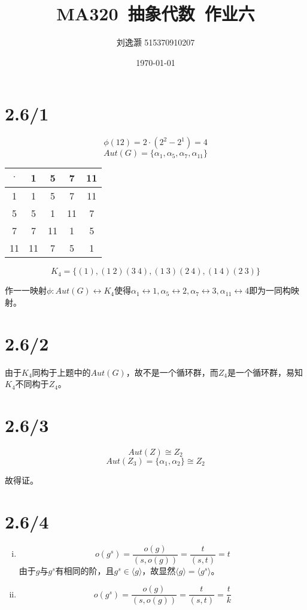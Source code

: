 \documentclass{article}
\title{MA320\ 抽象代数\ 作业六}
\author{刘逸灏 515370910207}
\date{\today}
\begin{document}
\maketitle

\section{2.6/1}
$$\phi(12)=2\cdot(2^2-2^1)=4$$
$$Aut(G)=\{\alpha_1,\alpha_5,\alpha_7,\alpha_{11}\}$$
\begin{center}
\begin{tabular}{c|cccc}
$\cdot$ & 1 & 5 & 7 & 11 \\\hline
1 & 1 & 5 & 7 & 11 \\
5 & 5 & 1 & 11 & 7\\
7 & 7 & 11 & 1 & 5\\
11 & 11 & 7 & 5 & 1\\
\end{tabular}
\end{center}

$$K_4=\{(1),(1\ 2)(3\ 4),(1\ 3)(2\ 4),(1\ 4)(2\ 3)\}$$

作一一映射$\phi:Aut(G)\leftrightarrow K_4$使得$\alpha_1\leftrightarrow 1,\alpha_5\leftrightarrow 2,\alpha_7\leftrightarrow 3,\alpha_{11}\leftrightarrow 4$即为一同构映射。

\section{2.6/2}
由于$K_4$同构于上题中的$Aut(G)$，故不是一个循环群，而$Z_4$是一个循环群，易知$K_4$不同构于$Z_4$。

\section{2.6/3}
$$Aut(Z)\cong Z_2$$
$$Aut(Z_3)=\{\alpha_1,\alpha_2\}\cong Z_2$$

故得证。

\section{2.6/4}
\begin{enumerate}[(i)]
\item
$$o(g^s)=\frac{o(g)}{(s,o(g))}=\frac{t}{(s,t)}=t$$
由于$g$与$g^s$有相同的阶，且$g^s\in\langle g\rangle$，故显然$\langle g\rangle=\langle g^s\rangle$。
\item
$$o(g^s)=\frac{o(g)}{(s,o(g))}=\frac{t}{(s,t)}=\frac{t}{k}$$
\end{enumerate}
\end{document}

